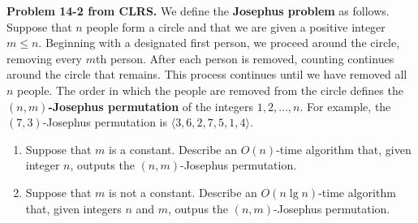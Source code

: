 \documentclass[11pt,letterpaper]{article}
\begin{document}
\noindent
\textbf{Problem 14-2 from CLRS.} 
We define the \textbf{Josephus problem} as follows. Suppose
that $n$ people form a circle and that we are given a
positive integer $m \leq n$. Beginning with a designated
first person, we proceed around the circle, removing every
$m$th person. After each person is removed, counting
continues around the circle that remains. This process
continues until we have removed all $n$ people. The order in
which the people are removed from the circle defines the
\textbf{$(n,m)$-Josephus permutation} of the integers
$1,2,\ldots,n$. For example, the $(7,3)$-Josephus
permutation is $\langle3,6,2,7,5,1,4\rangle$. 
\begin{enumerate}[label=\alph*),labelindent=0pt]
\item Suppose that $m$ is a constant. Describe an
$O(n)$-time algorithm that, given integer $n$, outputs the
$(n,m)$-Josephus permutation.
\item Suppose that $m$ is not a constant. Describe an $O(n
\lg n)$-time algorithm that, given integers $n$ and $m$,
outpus the 
$(n,m)$-Josephus permutation.
\end{enumerate}
\end{document}
